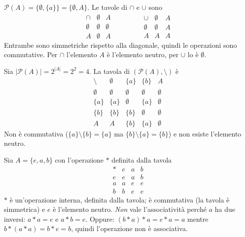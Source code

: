 \documentclass[11pt,a4paper]{article}
\begin{document}
\begin{esempio}[$A = \{a\}$]
$\mathcal{P}(A) = \{\emptyset, \{a\}\} = \{\emptyset, A\}$. Le tavole di $\cap$ e $\cup$ sono
\[
\begin{array}{c|cc}
  \cap & \emptyset & A \\ \hline
  \emptyset & \emptyset & \emptyset \\
  A & \emptyset & A
\end{array}
\qquad\qquad
\begin{array}{c|cc}
  \cup & \emptyset & A \\ \hline
  \emptyset & \emptyset & A \\
  A & A & A
\end{array}
\]
Entrambe sono simmetriche rispetto alla diagonale, quindi le operazioni sono commutative. Per $\cap$ l'elemento $A$ è l'elemento neutro, per $\cup$ lo è $\emptyset$.
\end{esempio}

\begin{esempio}[$A = \{a, b\}$, differenza insiemistica]
Sia $|\mathcal{P}(A)| = 2^{|A|} = 2^2 = 4$. La tavola di $(\mathcal{P}(A), \setminus)$ è
\[
\begin{array}{c|cccc}
  \setminus & \emptyset & \{a\} & \{b\} & A \\ \hline
  \emptyset & \emptyset & \emptyset & \emptyset & \emptyset \\
  \{a\} & \{a\} & \emptyset & \{a\} & \emptyset \\
  \{b\} & \{b\} & \{b\} & \emptyset & \emptyset \\
  A & A & \{b\} & \{a\} & \emptyset
\end{array}
\]
Non è commutativa ($\{a\}\setminus\{b\} = \{a\}$ ma $\{b\}\setminus\{a\} = \{b\}$) e non esiste l'elemento neutro.
\end{esempio}

\begin{esempio}
Sia $A = \{e, a, b\}$ con l'operazione $*$ definita dalla tavola
\[
\begin{array}{c|ccc}
  * & e & a & b \\ \hline
  e & e & a & b \\
  a & a & e & e \\
  b & b & e & e
\end{array}
\]
$*$ è un'operazione interna, definita dalla tavola; è commutativa (la tavola è simmetrica) e $e$ è l'elemento neutro. \emph{Non} vale l'associatività perché $a$ ha due inversi: $a * a = e$ e $a * b = e$. Oppure: $(b * a) * a = e * a = a$ mentre $b * (a * a) = b * e = b$, quindi l'operazione non è associativa.
\end{esempio}
\end{document}
